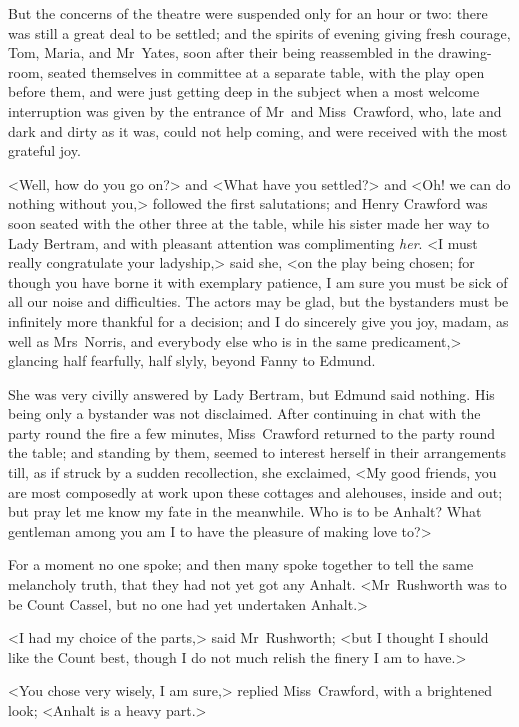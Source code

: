 But the concerns of the theatre were suspended only for an hour or two: there was still a great deal to be settled; and the spirits of evening giving fresh courage, Tom, Maria, and Mr~Yates, soon after their being reassembled in the drawing-room, seated themselves in committee at a separate table, with the play open before them, and were just getting deep in the subject when a most welcome interruption was given by the entrance of Mr~and Miss~Crawford, who, late and dark and dirty as it was, could not help coming, and were received with the most grateful joy.

<Well, how do you go on?> and <What have you settled?> and <Oh! we can do nothing without you,> followed the first salutations; and Henry Crawford was soon seated with the other three at the table, while his sister made her way to Lady Bertram, and with pleasant attention was complimenting \textit{her}. <I must really congratulate your ladyship,> said she, <on the play being chosen; for though you have borne it with exemplary patience, I am sure you must be sick of all our noise and difficulties. The actors may be glad, but the bystanders must be infinitely more thankful for a decision; and I do sincerely give you joy, madam, as well as Mrs~Norris, and everybody else who is in the same predicament,> glancing half fearfully, half slyly, beyond Fanny to Edmund.

She was very civilly answered by Lady Bertram, but Edmund said nothing. His being only a bystander was not disclaimed. After continuing in chat with the party round the fire a few minutes, Miss~Crawford returned to the party round the table; and standing by them, seemed to interest herself in their arrangements till, as if struck by a sudden recollection, she exclaimed, <My good friends, you are most composedly at work upon these cottages and alehouses, inside and out; but pray let me know my fate in the meanwhile. Who is to be Anhalt? What gentleman among you am I to have the pleasure of making love to?>

For a moment no one spoke; and then many spoke together to tell the same melancholy truth, that they had not yet got any Anhalt. <Mr~Rushworth was to be Count Cassel, but no one had yet undertaken Anhalt.>

<I had my choice of the parts,> said Mr~Rushworth; <but I thought I should like the Count best, though I do not much relish the finery I am to have.>

<You chose very wisely, I am sure,> replied Miss~Crawford, with a brightened look; <Anhalt is a heavy part.>

